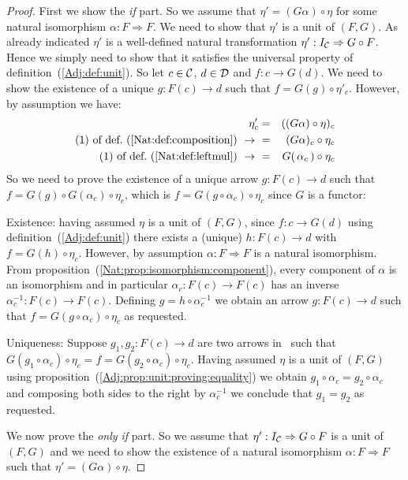 \noindent
\begin{proof}
    First we show the {\em if} part. So we assume that $\eta'=(G\alpha)\circ\eta$
    for some natural isomorphism $\alpha:F\Rightarrow F$. We need to show that
    $\eta'$ is a unit of $(F,G)$. As already indicated $\eta'$ is a well-defined
    natural transformation $\eta':I_{\cal C}\Rightarrow G\circ F$. Hence we
    simply need to show that it satisfies the universal property of 
    definition~(\ref{Adj:def:unit}). So let $c\in\mbox{$\cal C$}$, $d\in\mbox{$\cal D$}$ and 
    $f:c\to G(d)$. We need to show the existence of a unique $g:F(c)\to d$
    such that $f = G(g)\circ\eta'_{c}$. However, by assumption we have:
        \begin{eqnarray*}\eta'_{c}
            &=&((G\alpha)\circ\eta)_{c}\\
            \mbox{$(1)$ of def.~(\ref{Nat:def:composition})}\ \to\ 
            &=&(G\alpha)_{c}\circ\eta_{c}\\
            \mbox{$(1)$ of def.~(\ref{Nat:def:leftmul})}\ \to\ 
            &=&G(\,\alpha_{c}\,)\circ\eta_{c}\\
        \end{eqnarray*}
    So we need to prove the existence of a unique arrow $g:F(c)\to d$
    such that $f=G(g)\circ G(\alpha_{c})\circ\eta_{c}$, which is
    $f=G(g\circ\alpha_{c})\circ\eta_{c}$ since $G$ is a functor:

    Existence: having assumed $\eta$ is a unit of $(F,G)$, since 
    $f:c\to G(d)$ using definition~(\ref{Adj:def:unit}) there exists
    a (unique) $h:F(c)\to d$ with $f = G(h)\circ\eta_{c}$.
    However, by assumption $\alpha:F\Rightarrow F$ is a natural
    isomorphism. From proposition~(\ref{Nat:prop:isomorphism:component}),
    every component of $\alpha$ is an isomorphism and in particular
    $\alpha_{c}:F(c)\to F(c)$ has an inverse $\alpha_{c}^{-1}:F(c)\to F(c)$.
    Defining $g=h\circ\alpha_{c}^{-1}$ we obtain an arrow $g:F(c)\to d$ such
    that $f=G(g\circ\alpha_{c})\circ\eta_{c}$ as requested.

    Uniqueness: Suppose $g_{1},g_{2}:F(c)\to d$ are two arrows in \Dat\ 
    such that $G(g_{1}\circ\alpha_{c})\circ\eta_{c}=f=G(g_{2}\circ\alpha_{c})
    \circ\eta_{c}$. Having assumed $\eta$ is a unit of $(F,G)$ using
    proposition~(\ref{Adj:prop:unit:proving:equality}) we obtain 
    $g_{1}\circ\alpha_{c}=g_{2}\circ\alpha_{c}$ and composing both sides
    to the right by $\alpha_{c}^{-1}$ we conclude that $g_{1}=g_{2}$
    as requested.

    We now prove the {\em only if} part. So we assume that 
    $\eta':I_{\cal C}\Rightarrow G\circ F$ is a unit of $(F,G)$ and we need
    to show the existence of a natural isomorphism $\alpha:F\Rightarrow F$
    such that $\eta'=(G\alpha)\circ\eta$.
\end{proof}
